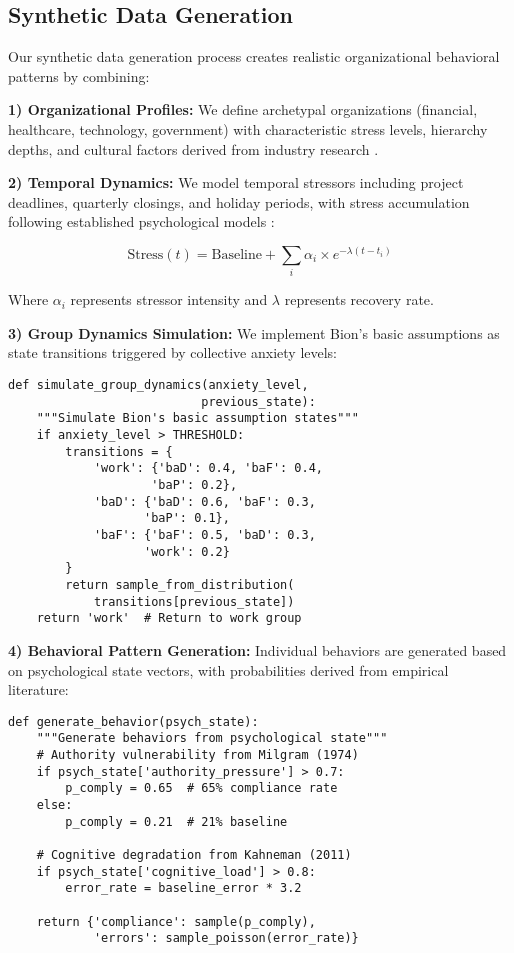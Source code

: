 \documentclass[10pt,twocolumn]{IEEEtran}
\begin{document}
\subsection{Synthetic Data Generation}

Our synthetic data generation process creates realistic organizational behavioral patterns by combining:

\textbf{1) Organizational Profiles:} We define archetypal organizations (financial, healthcare, technology, government) with characteristic stress levels, hierarchy depths, and cultural factors derived from industry research \cite{ponemon2023}.

\textbf{2) Temporal Dynamics:} We model temporal stressors including project deadlines, quarterly closings, and holiday periods, with stress accumulation following established psychological models \cite{lazarus1984}:

\begin{equation}
\text{Stress}(t) = \text{Baseline} + \sum_i \alpha_i \times e^{-\lambda(t-t_i)}
\end{equation}

Where $\alpha_i$ represents stressor intensity and $\lambda$ represents recovery rate.

\textbf{3) Group Dynamics Simulation:} We implement Bion's basic assumptions \cite{bion1961} as state transitions triggered by collective anxiety levels:

\begin{lstlisting}[caption={Group Dynamics Simulation},label={lst:group}]
def simulate_group_dynamics(anxiety_level, 
                           previous_state):
    """Simulate Bion's basic assumption states"""
    if anxiety_level > THRESHOLD:
        transitions = {
            'work': {'baD': 0.4, 'baF': 0.4, 
                    'baP': 0.2},
            'baD': {'baD': 0.6, 'baF': 0.3, 
                   'baP': 0.1},
            'baF': {'baF': 0.5, 'baD': 0.3, 
                   'work': 0.2}
        }
        return sample_from_distribution(
            transitions[previous_state])
    return 'work'  # Return to work group
\end{lstlisting}

\textbf{4) Behavioral Pattern Generation:} Individual behaviors are generated based on psychological state vectors, with probabilities derived from empirical literature:

\begin{lstlisting}[caption={Behavioral Pattern Generation},label={lst:behavior}]
def generate_behavior(psych_state):
    """Generate behaviors from psychological state"""
    # Authority vulnerability from Milgram (1974)
    if psych_state['authority_pressure'] > 0.7:
        p_comply = 0.65  # 65% compliance rate
    else:
        p_comply = 0.21  # 21% baseline
    
    # Cognitive degradation from Kahneman (2011)  
    if psych_state['cognitive_load'] > 0.8:
        error_rate = baseline_error * 3.2
    
    return {'compliance': sample(p_comply), 
            'errors': sample_poisson(error_rate)}
\end{lstlisting}
\end{document}
